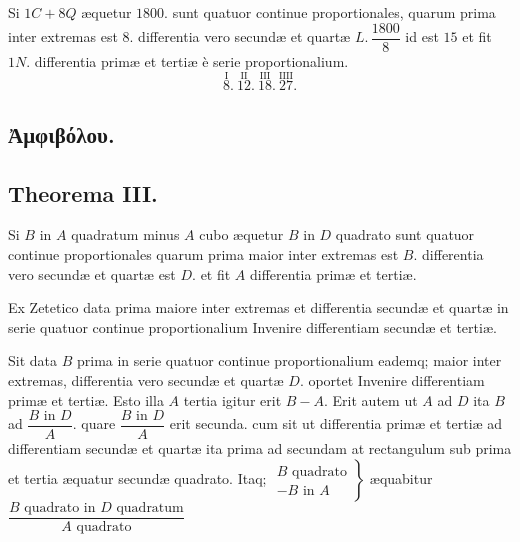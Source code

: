 \documentclass[11pt,a4paper]{article}
\begin{document}
Si $1C + 8Q$ æquetur $1800$. sunt quatuor continue proportionales, quarum prima inter extremas est $8$. differentia vero secundæ et quartæ $L.\,\dfrac{1800}{8}$ id est $15$ et fit $1N.$ differentia primæ et tertiæ è serie proportionalium.
\[ \overset{\mathrm{I}}{8}.\ \overset{\mathrm{II}}{12}.\ \overset{\mathrm{III}}{18}.\ \overset{\mathrm{IIII}}{27}. \]

\subsection*{Ἀμφιβόλου.}

\subsection*{Theorema III.}

Si $B$ in $A$ quadratum minus $A$ cubo æquetur $B$ in $D$ quadrato sunt quatuor continue proportionales quarum prima maior inter extremas est $B$. differentia vero secundæ et quartæ est $D$. et fit $A$ differentia primæ et tertiæ.

Ex Zetetico data prima maiore inter extremas et differentia secundæ et quartæ in serie quatuor continue proportionalium Invenire differentiam secundæ et tertiæ.

Sit data $B$ prima in serie quatuor continue proportionalium eademq; maior inter extremas, differentia vero secundæ et quartæ $D$. oportet Invenire differentiam primæ et tertiæ. Esto illa $A$ tertia igitur erit $B - A$. Erit autem ut $A$ ad $D$ ita $B$ ad $\dfrac{B \text{ in } D}{A}$. quare $\dfrac{B \text{ in } D}{A}$ erit secunda. cum sit ut differentia primæ et tertiæ ad differentiam secundæ et quartæ ita prima ad secundam at rectangulum sub prima et tertia æquatur secundæ quadrato. Itaq; $\left.\begin{array}{l} B \text{ quadrato} \\ - B \text{ in } A \end{array}\right\}$ æquabitur $\dfrac{B \text{ quadrato in } D \text{ quadratum}}{A \text{ quadrato}}$

\end{document}
